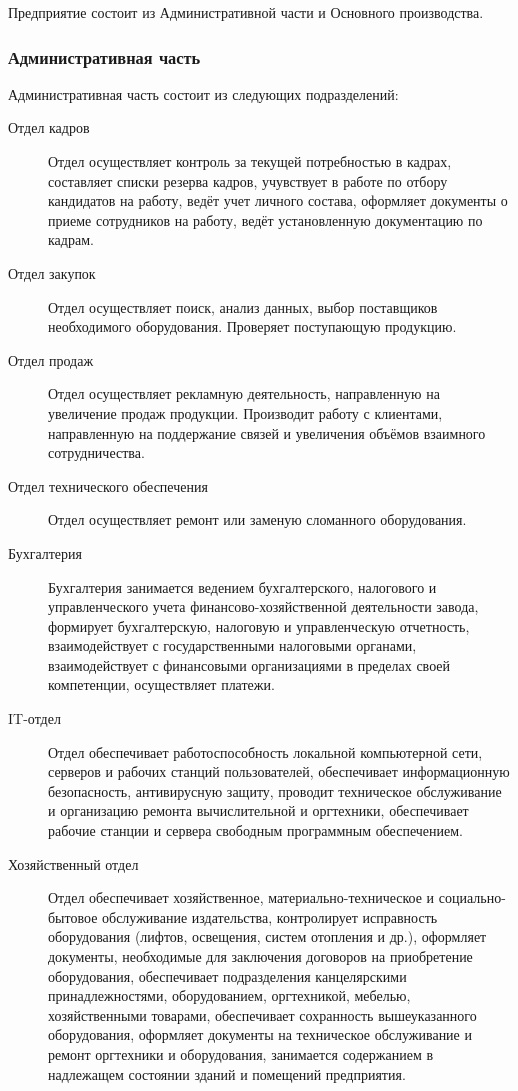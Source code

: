 Предприятие состоит из Административной части и Основного производства.

\subsubsection{Административная часть}
Административная часть состоит из следующих подразделений:
\begin{description}
\item [Отдел кадров]
  Отдел осуществляет контроль за текущей потребностью в кадрах, составляет списки резерва кадров, учувствует в работе по отбору кандидатов на работу, ведёт учет личного состава, оформляет документы о приеме сотрудников на работу, ведёт установленную документацию по кадрам.
\item [Отдел закупок]
  Отдел осуществляет поиск, анализ данных, выбор поставщиков необходимого оборудования. Проверяет поступающую продукцию.
\item [Отдел продаж]
  Отдел осуществляет рекламную деятельность, направленную на увеличение продаж продукции. Производит работу с клиентами, направленную на поддержание связей и увеличения объёмов взаимного сотрудничества.
\item [Отдел технического обеспечения]
  Отдел осуществляет ремонт или заменую сломанного оборудования.
\item [Бухгалтерия]
  Бухгалтерия занимается ведением бухгалтерского, налогового и управленческого учета финансово-хозяйственной деятельности завода, формирует бухгалтерскую, налоговую и управленческую отчетность, взаимодействует с государственными налоговыми органами, взаимодействует с финансовыми организациями в пределах своей компетенции, осуществляет платежи.
\item [IT-отдел]
  Отдел обеспечивает работоспособность локальной компьютерной сети, серверов и рабочих станций пользователей, обеспечивает информационную безопасность, антивирусную защиту, проводит техническое обслуживание и организацию ремонта вычислительной и оргтехники, обеспечивает рабочие станции и сервера свободным программным обеспечением.
\item [Хозяйственный отдел]
  Отдел обеспечивает хозяйственное, материально-техническое и социально-бытовое обслуживание издательства, контролирует исправность оборудования (лифтов, освещения, систем отопления и др.), оформляет документы, необходимые для заключения договоров на приобретение оборудования, обеспечивает подразделения канцелярскими принадлежностями, оборудованием, оргтехникой, мебелью, хозяйственными товарами, обеспечивает сохранность вышеуказанного оборудования, оформляет документы на техническое обслуживание и ремонт оргтехники и оборудования, занимается содержанием в надлежащем состоянии зданий и помещений предприятия.
\end{description}

